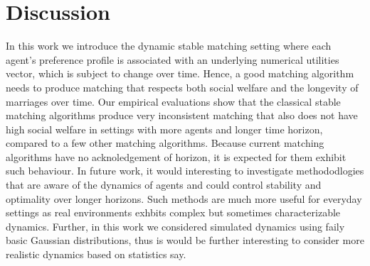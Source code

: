 \section{Discussion}
In this work we introduce the dynamic stable matching setting where each agent's preference profile is associated with an underlying numerical utilities vector, which is subject to change over time. Hence, a good matching algorithm needs to produce matching that respects both social welfare and the longevity of marriages over time. Our empirical evaluations show that the classical stable matching algorithms produce very inconsistent matching that also does not have high social welfare in settings with more agents and longer time horizon, compared to a few other matching algorithms. Because current matching algorithms have no acknoledgement of horizon, it is expected for them exhibit such behaviour. In future work, it would interesting to investigate methododlogies that are aware of the dynamics of agents and could control stability and optimality over longer horizons. Such methods are much more useful for everyday settings as real environments exhbits complex but sometimes characterizable dynamics. Further, in this work we considered simulated dynamics using faily basic Gaussian distributions, thus is would be further interesting to consider more realistic dynamics based on statistics say.
